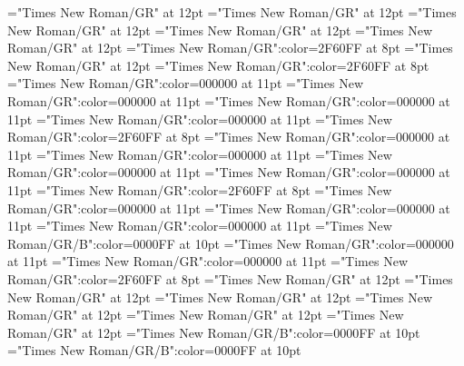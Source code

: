 \documentclass[a4paper]{article}
\begin{document}
\font\sensesensesentrybletDatadicBody="Times New Roman/GR" at 12pt
\font\grammaticalinfosensesensesentrybletDatadicBody="Times New Roman/GR" at 12pt
\font\partofspeechptgrammaticalinfosensesensesentrybletDatadicBody="Times New Roman/GR" at 12pt
\font{}="Times New Roman/GR" at 12pt
\font\xitemptdefinitionLcptsensesensesentrybletDatadicBody="Times New Roman/GR" at 12pt
\font\xlanguagetagenxitemptdefinitionLcptsensesensesentrybletDatadicBody="Times New Roman/GR":color=2F60FF at 8pt
\font\xitemendefinitionLcptsensesensesentrybletDatadicBody="Times New Roman/GR" at 12pt
\font\xlanguagetagenxitemendefinitionLcptsensesensesentrybletDatadicBody="Times New Roman/GR":color=2F60FF at 8pt
\font\relationssensesensesentryletDatadicBody="Times New Roman/GR":color=000000 at 11pt
\font\lexreftargetsrelationssensesensesentryletDatadicBody="Times New Roman/GR":color=000000 at 11pt
\font\sensecrossrefsehlexreftargetsrelationssensesensesentryletDatadicBody="Times New Roman/GR":color=000000 at 11pt
\font{}="Times New Roman/GR":color=000000 at 11pt
\font\xlanguagetagendefinitionptsensesensesentryletDatadicBody="Times New Roman/GR":color=2F60FF at 8pt
\font\examplessensesensesentryletDatadicBody="Times New Roman/GR":color=000000 at 11pt
\font\examplesehexamplessensesensesentryletDatadicBody="Times New Roman/GR":color=000000 at 11pt
\font\translationsexamplessensesensesentryletDatadicBody="Times New Roman/GR":color=000000 at 11pt
\font\translationpttranslationsexamplessensesensesentryletDatadicBody="Times New Roman/GR":color=000000 at 11pt
\font\xlanguagetagentranslationpttranslationsexamplessensesensesentryletDatadicBody="Times New Roman/GR":color=2F60FF at 8pt
\font\xitemrelationssensesensesentryletDatadicBody="Times New Roman/GR":color=000000 at 11pt
\font\lexreftargetsxitemrelationssensesensesentryletDatadicBody="Times New Roman/GR":color=000000 at 11pt
\font\sensecrossrefsehlexreftargetsxitemrelationssensesensesentryletDatadicBody="Times New Roman/GR":color=000000 at 11pt
\font\xhomographnumberptheadwordsehentryletDatadicBody="Times New Roman/GR/B":color=0000FF at 10pt
\font\xsensenumberLcensensesensesentryletDatadicBody="Times New Roman/GR":color=000000 at 11pt
\font{}="Times New Roman/GR":color=000000 at 11pt
\font\xlanguagetagendefinitionLcensensesensesentryletDatadicBody="Times New Roman/GR":color=2F60FF at 8pt
\font\entrycletDatadicBody="Times New Roman/GR" at 12pt
\font\pictureRightNoneentrycletDatadicBody="Times New Roman/GR" at 12pt
\font\picturepictureRightNoneentrycletDatadicBody="Times New Roman/GR" at 12pt
\font\pictureCaptionpictureRightNoneentrycletDatadicBody="Times New Roman/GR" at 12pt
\font\CmPicturepublishStemCaptionSenseNumberpictureCaptionpictureRightNoneentrycletDatadicBody="Times New Roman/GR" at 12pt
\font\CmPicturepublishStemCaptionCaptionPubptpictureCaptionpictureRightNoneentrycletDatadicBody="Times New Roman/GR" at 12pt
\font\headwordsehentrycletDatadicBody="Times New Roman/GR/B":color=0000FF at 10pt
\font\headwordafterentrycletDatadicBody="Times New Roman/GR/B":color=0000FF at 10pt
\end{document}
